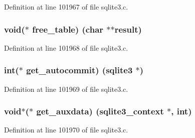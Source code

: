Definition at line 101967 of file sqlite3.\+c.

\hypertarget{structsqlite3__api__routines_a9eb7ca42560b20ece336d287c1310092}{}
\subsubsection[{free\+\_\+table}]{\setlength{\rightskip}{0pt plus 5cm}void($\ast$ free\+\_\+table) (char $\ast$$\ast$result)}\label{structsqlite3__api__routines_a9eb7ca42560b20ece336d287c1310092}


Definition at line 101968 of file sqlite3.\+c.

\hypertarget{structsqlite3__api__routines_ab572e00bb6528214f3df218c02ada7d2}{}
\subsubsection[{get\+\_\+autocommit}]{\setlength{\rightskip}{0pt plus 5cm}int($\ast$ get\+\_\+autocommit) ({\bf sqlite3} $\ast$)}\label{structsqlite3__api__routines_ab572e00bb6528214f3df218c02ada7d2}


Definition at line 101969 of file sqlite3.\+c.

\hypertarget{structsqlite3__api__routines_a1a7c357699dbe4d5599433c442843466}{}
\subsubsection[{get\+\_\+auxdata}]{\setlength{\rightskip}{0pt plus 5cm}void$\ast$($\ast$ get\+\_\+auxdata) ({\bf sqlite3\+\_\+context} $\ast$, int)}\label{structsqlite3__api__routines_a1a7c357699dbe4d5599433c442843466}


Definition at line 101970 of file sqlite3.\+c.

\hypertarget{structsqlite3__api__routines_a06283d641523bfc7591489d1e52029ac}{}
